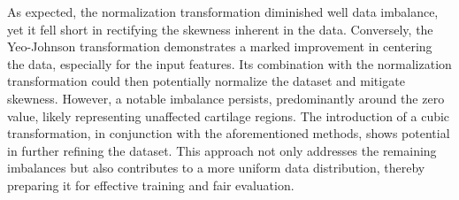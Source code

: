 \documentclass[12pt,a4paper]{report}
\begin{document}
As expected, the normalization transformation diminished well data imbalance, yet it fell short in rectifying the skewness inherent in the data. Conversely, the Yeo-Johnson transformation demonstrates a marked improvement in centering the data, especially for the input features. Its combination with the normalization transformation could then potentially normalize the dataset and mitigate skewness. However, a notable imbalance persists, predominantly around the zero value, likely representing unaffected cartilage regions. The introduction of a cubic transformation, in conjunction with the aforementioned methods, shows potential in further refining the dataset. This approach not only addresses the remaining imbalances but also contributes to a more uniform data distribution, thereby preparing it for effective training and fair evaluation.
\end{document}
